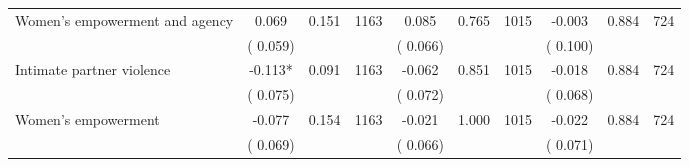 \begin{tabular}{l*{9}{c}}
 Women's empowerment and agency                &              0.069        &        0.151 & 1163        &              0.085 &        0.765 & 1015               &       -0.003 &        0.884 & 724       \\ 
                               &        (       0.059) & &                                                                &       (       0.066) & &                                                         &       (       0.100) & & \\ 
 Intimate partner violence                &             -0.113*        &        0.091 & 1163        &             -0.062 &        0.851 & 1015               &       -0.018 &        0.884 & 724       \\ 
                               &        (       0.075) & &                                                                &       (       0.072) & &                                                         &       (       0.068) & & \\ 
 Women's empowerment                &             -0.077        &        0.154 & 1163        &             -0.021 &        1.000 & 1015               &       -0.022 &        0.884 & 724       \\ 
                               &        (       0.069) & &                                                                &       (       0.066) & &                                                         &       (       0.071) & & \\ 
\hline \end{tabular}                                                                                                                                                      